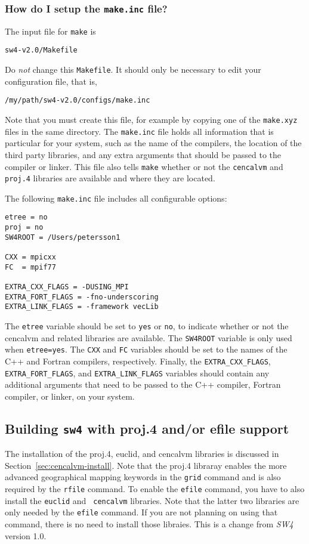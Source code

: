 \documentclass[11pt]{article}
\begin{document}
\subsubsection{How do I setup the {\tt make.inc} file?}

The input file for \verb+make+ is
\begin{verbatim}
sw4-v2.0/Makefile
\end{verbatim}
Do {\em not} change this \verb+Makefile+. It should only be necessary to edit your configuration
file, that is,
\begin{verbatim}
/my/path/sw4-v2.0/configs/make.inc
\end{verbatim}
Note that you must create this file, for example by copying one of the \verb+make.xyz+ files in the
same directory. The \verb+make.inc+ file holds all information that is particular for your system,
such as the name of the compilers, the location of the third party libraries, and any extra
arguments that should be passed to the compiler or linker. This file also tells \verb+make+ whether
or not the \verb+cencalvm+ and \verb+proj.4+ libraries are available and where they are located.

The following \verb+make.inc+ file includes all configurable options:
\begin{verbatim}
etree = no
proj = no
SW4ROOT = /Users/petersson1

CXX = mpicxx
FC  = mpif77

EXTRA_CXX_FLAGS = -DUSING_MPI
EXTRA_FORT_FLAGS = -fno-underscoring
EXTRA_LINK_FLAGS = -framework vecLib
\end{verbatim}
The \verb+etree+ variable should be set to \verb+yes+ or \verb+no+, to indicate whether or not the
cencalvm and related libraries are available. The \verb+SW4ROOT+ variable is only used when
\verb+etree=yes+. The \verb+CXX+ and \verb+FC+ variables should be set to the names of the C++ and
Fortran compilers, respectively. Finally, the \verb+EXTRA_CXX_FLAGS+, \verb+EXTRA_FORT_FLAGS+, and
\verb+EXTRA_LINK_FLAGS+ variables should contain any additional arguments that need to be passed to
the C++ compiler, Fortran compiler, or linker, on your system.

\subsection{Building {\tt sw4} with proj.4 and/or efile support}
The installation of the proj.4, euclid, and cencalvm libraries is discussed in
Section~\ref{sec:cencalvm-install}. Note that the proj.4 libraray enables the more advanced
geographical mapping keywords in the {\tt grid} command and is also required by the {\tt rfile}
command. To enable the {\tt efile} command, you have to also install the {\tt euclid} and {\tt
  cencalvm} libraries. Note that the latter two libraries are only needed by the {\tt efile}
command. If you are not planning on using that command, there is no need to install those
libraies. This is a change from \emph{SW4} version 1.0.
\end{document}
